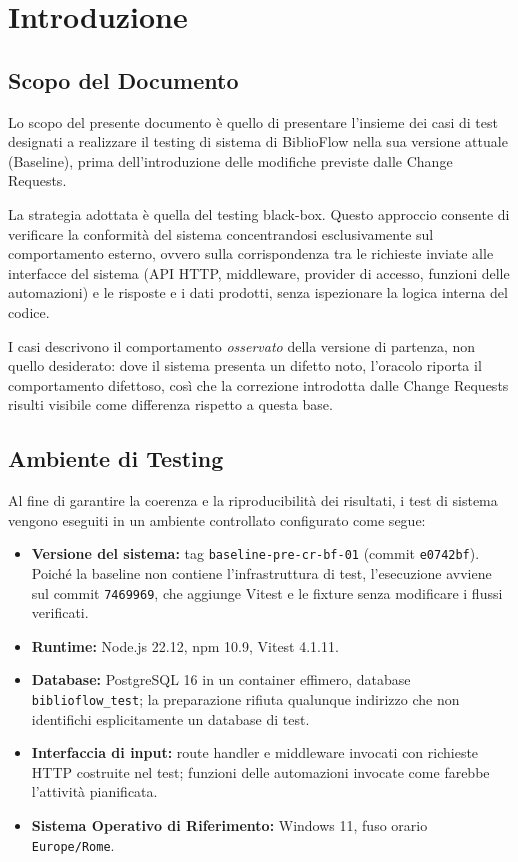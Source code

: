 \documentclass[11pt,a4paper,oneside,openany]{book}
\begin{document}
\frontmatter
\copertina
\tableofcontents
\listoftables

\mainmatter
\chapter{Introduzione}

\section{Scopo del Documento}

Lo scopo del presente documento è quello di presentare l'insieme dei casi di
test designati a realizzare il testing di sistema di BiblioFlow nella sua
versione attuale (Baseline), prima dell'introduzione delle modifiche previste
dalle Change Requests.

La strategia adottata è quella del testing black-box. Questo approccio
consente di verificare la conformità del sistema concentrandosi esclusivamente
sul comportamento esterno, ovvero sulla corrispondenza tra le richieste
inviate alle interfacce del sistema (API HTTP, middleware, provider di
accesso, funzioni delle automazioni) e le risposte e i dati prodotti, senza
ispezionare la logica interna del codice.

I casi descrivono il comportamento \emph{osservato} della versione di partenza,
non quello desiderato: dove il sistema presenta un difetto noto, l'oracolo
riporta il comportamento difettoso, così che la correzione introdotta dalle
Change Requests risulti visibile come differenza rispetto a questa base.

\section{Ambiente di Testing}

Al fine di garantire la coerenza e la riproducibilità dei risultati, i test di
sistema vengono eseguiti in un ambiente controllato configurato come segue:
\begin{itemize}
  \item \textbf{Versione del sistema:} tag \texttt{baseline-pre-cr-bf-01}
        (commit \texttt{e0742bf}). Poiché la baseline non contiene
        l'infrastruttura di test, l'esecuzione avviene sul commit
        \texttt{7469969}, che aggiunge Vitest e le fixture senza modificare i
        flussi verificati.
  \item \textbf{Runtime:} Node.js 22.12, npm 10.9, Vitest 4.1.11.
  \item \textbf{Database:} PostgreSQL 16 in un container effimero, database
        \texttt{biblioflow\_test}; la preparazione rifiuta qualunque indirizzo
        che non identifichi esplicitamente un database di test.
  \item \textbf{Interfaccia di input:} route handler e middleware invocati
        con richieste HTTP costruite nel test; funzioni delle automazioni
        invocate come farebbe l'attività pianificata.
  \item \textbf{Sistema Operativo di Riferimento:} Windows 11, fuso orario
        \texttt{Europe/Rome}.
\end{itemize}
\end{document}

